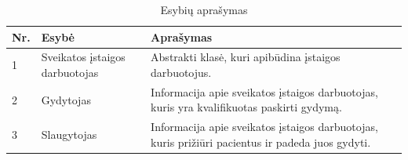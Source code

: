 \begin{table}[!ht]
    \centering
    \renewcommand{\arraystretch}{1.2}
    \renewcommand\thetable{7}
    \caption{Esybių aprašymas} 

    \begin{tabular}{|m{3em}|m{12em}|m{22em}|}
    \hline 
    \rowcolor[HTML]{EFEFEF} 
    Nr. & Esybė & Aprašymas \\ \hline

    1  &  Sveikatos įstaigos darbuotojas  & Abstrakti klasė, kuri apibūdina įstaigos darbuotojus.      \\ \hline
    2  &  Gydytojas  & Informacija apie sveikatos įstaigos darbuotojas, kuris yra kvalifikuotas paskirti gydymą.     \\ \hline
    3  &  Slaugytojas  & Informacija apie sveikatos įstaigos darbuotojas, kuris prižiūri pacientus ir padeda juos gydyti.    \\ \hline

    \end{tabular}

\end{table}

